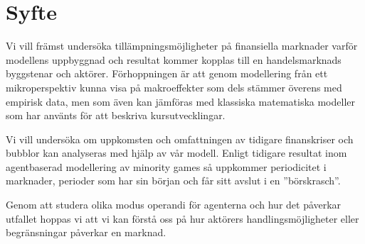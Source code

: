 \section{Syfte}


Vi vill främst undersöka tillämpningsmöjligheter på finansiella marknader varför modellens uppbyggnad och resultat kommer kopplas till en handelsmarknads byggstenar och aktörer. Förhoppningen är att genom modellering från ett mikroperspektiv kunna visa på makroeffekter som dels stämmer överens med empirisk data, men som även kan jämföras med klassiska matematiska modeller som har använts för att beskriva kursutvecklingar.

Vi vill undersöka om uppkomsten och omfattningen av tidigare finanskriser och bubblor kan analyseras med hjälp av vår modell. Enligt tidigare resultat inom agentbaserad modellering av minority games \cite{MarketCrashes} så uppkommer periodicitet i marknader, perioder som har sin början och får sitt avslut i en ''börskrasch''.

Genom att studera olika modus operandi för agenterna och hur det påverkar utfallet hoppas vi att vi kan förstå oss på hur aktörers handlingsmöjligheter eller begränsningar påverkar en marknad.






